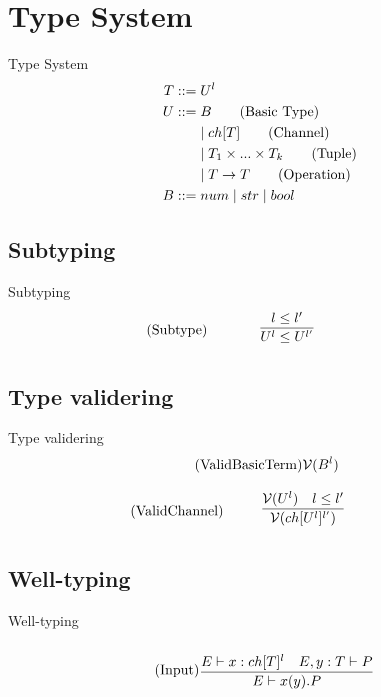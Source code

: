 \section{Type System}
\begin{frame}{Type System}
    \begin{align*}
        T::=&\;U^l\\    	
        U::=&\;B \tag{Basic Type}\\
        &\mid ch[T] \tag{Channel}\\
        &\mid T_1 \times...\times T_k \tag{Tuple}\\
        &\mid T\rightarrow T \tag{Operation}\\
        B::=&\;num 
        \mid str
        \mid bool\\
    \end{align*}
\end{frame}

\subsection{Subtyping}
\begin{frame}{Subtyping}
    \begin{align*}
       \tag{Subtype}\label{rule:Subtype} &\infrule{l\leq l'}{U^l\leq U^{l'}}
    \end{align*}
\end{frame}

\subsection{Type validering}
\begin{frame}{Type validering}
    \begin{align*}
        \tag{ValidBasicTerm}\label{rule:ValidBasicTerm} &\mathcal{V}(B^l)
    \end{align*}

    \begin{align*}
        \tag{ValidChannel}\label{rule:ValidChannel} &\infrule{\valid{U^l}\quad l\leq l'}{\valid{ch[U^l]^{l'}}}
    \end{align*}
\end{frame}

\subsection{Well-typing}
\begin{frame}{Well-typing}
    \begin{align*}
        \tag{Input}\label{rule:Input} &\infrule{E\vdash x:ch[T]^l\quad E,y:T\vdash P}{E \vdash \inp{x}{y}P}
    \end{align*}
\end{frame}



